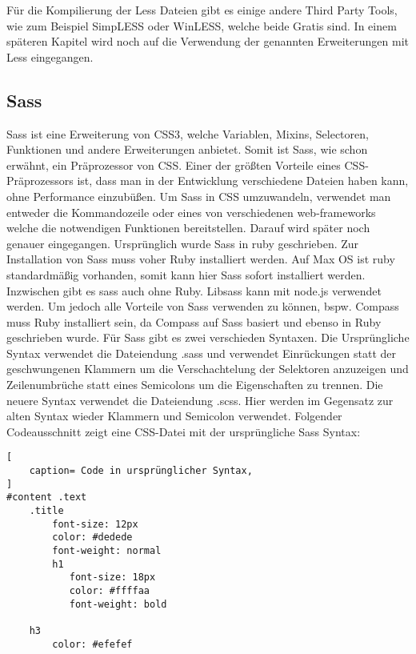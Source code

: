 Für die Kompilierung der Less Dateien gibt es einige andere Third Party Tools, wie zum Beispiel SimpLESS oder WinLESS, welche beide Gratis sind.\newline
In einem späteren Kapitel wird noch auf die Verwendung der genannten Erweiterungen mit Less eingegangen.
\newpage
\subsection{Sass}
Sass ist eine Erweiterung von CSS3, welche Variablen, Mixins, Selectoren, Funktionen und andere Erweiterungen anbietet. Somit ist Sass, wie schon erwähnt, ein Präprozessor von CSS.\newline
Einer der größten Vorteile eines CSS-Präprozessors ist, dass man in der Entwicklung verschiedene Dateien haben kann, ohne Performance einzubüßen.\newline
Um Sass in CSS umzuwandeln, verwendet man entweder die Kommandozeile oder eines von verschiedenen web-frameworks welche die notwendigen Funktionen bereitstellen. Darauf wird später noch genauer eingegangen.\newline
Ursprünglich wurde Sass in ruby geschrieben. Zur Installation von Sass muss voher Ruby installiert werden. Auf Max OS ist ruby standardmäßig vorhanden, somit kann hier Sass sofort installiert werden. Inzwischen gibt es sass auch ohne Ruby. Libsass kann mit node.js verwendet werden. \newline
Um jedoch alle Vorteile von Sass verwenden zu können, bspw. Compass muss Ruby installiert sein, da Compass auf Sass basiert und ebenso in Ruby geschrieben wurde.\newline
Für Sass gibt es zwei verschieden Syntaxen. Die Ursprüngliche Syntax verwendet die Dateiendung .sass und verwendet Einrückungen statt der geschwungenen Klammern um die Verschachtelung der Selektoren anzuzeigen und Zeilenumbrüche statt eines Semicolons um die Eigenschaften zu trennen.\newline
Die neuere Syntax verwendet die Dateiendung .scss. Hier werden im Gegensatz zur alten Syntax wieder Klammern und Semicolon verwendet.  \autocite[]{Yard.2014}\newline
Folgender Codeausschnitt zeigt eine CSS-Datei mit der ursprüngliche Sass Syntax:
\begin{lstlisting}[
	caption= Code in ursprünglicher Syntax,
]
#content .text
    .title
        font-size: 12px
        color: #dedede
        font-weight: normal
        h1
           font-size: 18px
           color: #ffffaa
           font-weight: bold
    
    h3
        color: #efefef
    
\end{lstlisting}

